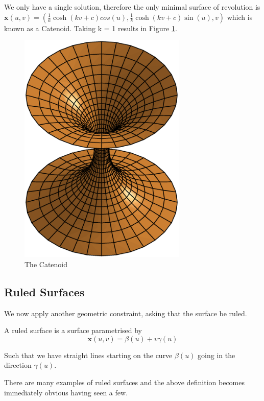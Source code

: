 We only have a single solution, therefore the only minimal surface of revolution is $\mathbf x(u,v) = (\frac{1}{k} \cosh(kv+c) cos(u), \frac{1}{k} \cosh(kv+c) \sin(u), v)$ which is known as a Catenoid. Taking k = 1 results in Figure \ref{fig:catenoid}.

\begin{figure}[htbp]
	\centering
       \includegraphics[width=8cm]{Images/Catenoid.eps}
   \caption{The Catenoid}
   \label{fig:catenoid}
\end{figure} 

\subsection{Ruled Surfaces}
We now apply another geometric constraint, asking that the surface be ruled.
\begin{definition}
A ruled surface is a surface parametrised by
\begin{displaymath}
\mathbf x(u,v) = \beta(u) + v \gamma(u)
\end{displaymath}

Such that we have straight lines starting on the curve $\beta(u)$ going in the direction $\gamma(u)$.
\end{definition}

There are many examples of ruled surfaces and the above definition becomes immediately obvious having seen a few.

